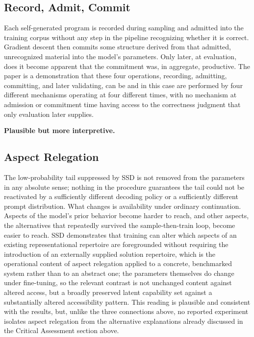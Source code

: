 \documentclass[11pt]{article}
\begin{document}
\subsection{Record, Admit, Commit}

Each self-generated program is recorded during sampling and admitted into the training corpus without any step in the pipeline recognizing whether it is correct. Gradient descent then commits some structure derived from that admitted, unrecognized material into the model's parameters. Only later, at evaluation, does it become apparent that the commitment was, in aggregate, productive. The paper is a demonstration that these four operations, recording, admitting, committing, and later validating, can be and in this case are performed by four different mechanisms operating at four different times, with no mechanism at admission or commitment time having access to the correctness judgment that only evaluation later supplies.

\textbf{Plausible but more interpretive.}

\subsection{Aspect Relegation}

The low-probability tail suppressed by SSD is not removed from the parameters in any absolute sense; nothing in the procedure guarantees the tail could not be reactivated by a sufficiently different decoding policy or a sufficiently different prompt distribution. What changes is availability under ordinary continuation. Aspects of the model's prior behavior become harder to reach, and other aspects, the alternatives that repeatedly survived the sample-then-train loop, become easier to reach. SSD demonstrates that training can alter which aspects of an existing representational repertoire are foregrounded without requiring the introduction of an externally supplied solution repertoire, which is the operational content of aspect relegation applied to a concrete, benchmarked system rather than to an abstract one; the parameters themselves do change under fine-tuning, so the relevant contrast is not unchanged content against altered access, but a broadly preserved latent capability set against a substantially altered accessibility pattern. This reading is plausible and consistent with the results, but, unlike the three connections above, no reported experiment isolates aspect relegation from the alternative explanations already discussed in the Critical Assessment section above.
\end{document}
